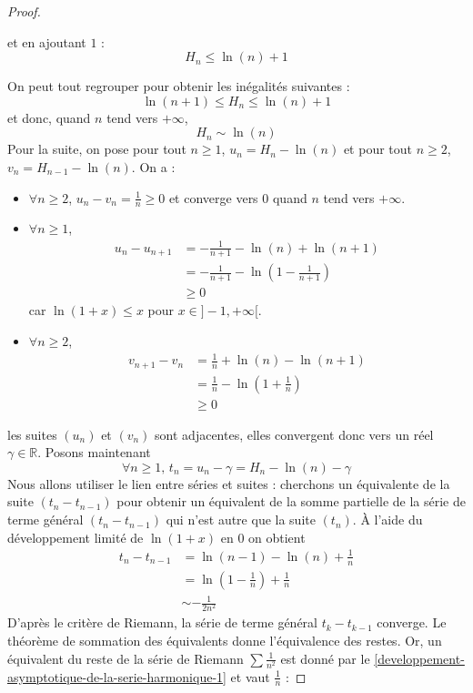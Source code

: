 \begin{proof}
\begin{itemize}
      et en ajoutant $1$ :
      \[ H_n \leq \ln(n) + 1 \]
    \end{itemize}
    On peut tout regrouper pour obtenir les inégalités suivantes :
    \[ \ln(n+1) \leq H_n \leq \ln(n) + 1 \]
    et donc, quand $n$ tend vers $+\infty$,
    \[ H_n \sim \ln(n) \]
    Pour la suite, on pose pour tout $n \geq 1$, $u_n = H_n - \ln(n)$ et pour tout $n \geq 2$, $v_n = H_{n-1} - \ln(n)$. On a :
    \begin{itemize}
      \item $\forall n \geq 2$, $u_n - v_n = \frac{1}{n} \geq 0$ et converge vers $0$ quand $n$ tend vers $+\infty$.
      \item $\forall n \geq 1$,
      \begin{align*}
        u_n - u_{n+1} &= -\frac{1}{n+1} - \ln(n) + \ln(n+1) \\
        &= -\frac{1}{n+1} - \ln \left( 1 - \frac{1}{n+1} \right) \\
        &\geq 0
      \end{align*}
      car $\ln(1+x) \leq x$ pour $x \in ]-1, +\infty[$.
      \item $\forall n \geq 2$,
      \begin{align*}
        v_{n+1} - v_n &= \frac{1}{n} + \ln(n) - \ln(n+1) \\
        &= \frac{1}{n} - \ln \left( 1 + \frac{1}{n} \right) \\
        &\geq 0
      \end{align*}
    \end{itemize}
    les suites $(u_n)$ et $(v_n)$ sont adjacentes, elles convergent donc vers un réel $\gamma \in \mathbb{R}$. Posons maintenant
    \[ \forall n \geq 1, \, t_n = u_n - \gamma = H_n - \ln(n) - \gamma \]
    Nous allons utiliser le lien entre séries et suites : cherchons un équivalente de la suite $(t_n - t_{n-1})$ pour obtenir un équivalent de la somme partielle de la série de terme général $(t_n - t_{n-1})$ qui n'est autre que la suite $(t_n)$. À l'aide du développement limité de $\ln(1+x)$ en $0$ on obtient
    \begin{align*}
      t_n - t_{n-1} &= \ln(n-1) - \ln(n) + \frac{1}{n} \\
      &= \ln \left( 1 - \frac{1}{n} \right) + \frac{1}{n} \\
      &\sim -\frac{1}{2n^2}
    \end{align*}
    D'après le critère de Riemann, la série de terme général $t_k - t_{k-1}$ converge. Le théorème de sommation des équivalents donne l'équivalence des restes. Or, un équivalent du reste de la série de Riemann $\sum \frac{1}{n^2}$ est donné par le \cref{developpement-asymptotique-de-la-serie-harmonique-1} et vaut $\frac{1}{n}$ :

\end{proof}
